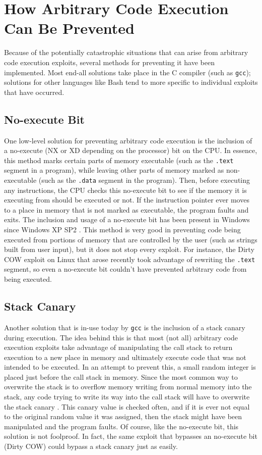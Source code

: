 \section{How Arbitrary Code Execution Can Be Prevented}

Because of the potentially catastrophic situations that can arise from arbitrary code execution exploits, several methods for preventing it have been implemented. Most end-all solutions take place in the C compiler (such as \texttt{gcc}); solutions for other languages like Bash tend to more specific to individual exploits that have occurred.

\subsection{No-execute Bit}

One low-level solution for preventing arbitrary code execution is the inclusion of a no-execute (NX or XD depending on the processor) bit on the CPU. In essence, this method marks certain parts of memory executable (such as the \texttt{.text} segment in a program), while leaving other parts of memory marked as non-executable (such as the \texttt{.data} segment in the program). Then, before executing any instructions, the CPU checks this no-execute bit to see if the memory it is executing from should be executed or not. If the instruction pointer ever moves to a place in memory that is not marked as executable, the program faults and exits. The inclusion and usage of a no-execute bit has been present in Windows since Windows XP SP2 \cite{andersen_abella_2004}. This method is very good in preventing code being executed from portions of memory that are controlled by the user (such as strings built from user input), but it does not stop every exploit. For instance, the Dirty COW exploit on Linux that arose recently took advantage of rewriting the \texttt{.text} segment, so even a no-execute bit couldn't have prevented arbitrary code from being executed.

\subsection{Stack Canary}

Another solution that is in-use today by \texttt{gcc} is the inclusion of a stack canary during execution. The idea behind this is that most (not all) arbitrary code execution exploits take advantage of manipulating the call stack to return execution to a new place in memory and ultimately execute code that was not intended to be executed. In an attempt to prevent this, a small random integer is placed just before the call stack in memory. Since the most common way to overwrite the stack is to overflow memory writing from normal memory into the stack, any code trying to write its way into the call stack will have to overwrite the stack canary \cite{dowd_mcdonald_schuh_2006}. This canary value is checked often, and if it is ever not equal to the original random value it was assigned, then the stack might have been manipulated and the program faults. Of course, like the no-execute bit, this solution is not foolproof. In fact, the same exploit that bypasses an no-execute bit (Dirty COW) could bypass a stack canary just as easily.

